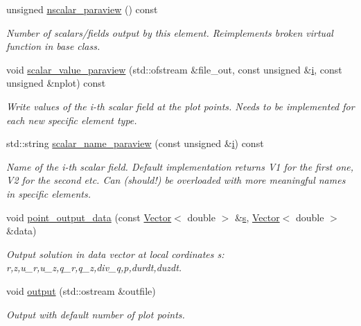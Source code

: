 \begin{DoxyCompactItemize}
unsigned \hyperlink{classoomph_1_1AxisymmetricPoroelasticityEquations_a2c1254018631fe41ba7c480303f3503a}{nscalar\+\_\+paraview} () const
\begin{DoxyCompactList}\small\item\em Number of scalars/fields output by this element. Reimplements broken virtual function in base class. \end{DoxyCompactList}\item 
void \hyperlink{classoomph_1_1AxisymmetricPoroelasticityEquations_a1131ce60ca4c3ad6b213913447e4ac69}{scalar\+\_\+value\+\_\+paraview} (std\+::ofstream \&file\+\_\+out, const unsigned \&\hyperlink{cfortran_8h_adb50e893b86b3e55e751a42eab3cba82}{i}, const unsigned \&nplot) const
\begin{DoxyCompactList}\small\item\em Write values of the i-\/th scalar field at the plot points. Needs to be implemented for each new specific element type. \end{DoxyCompactList}\item 
std\+::string \hyperlink{classoomph_1_1AxisymmetricPoroelasticityEquations_aac4a8c545c8223f5e72249dda357202b}{scalar\+\_\+name\+\_\+paraview} (const unsigned \&\hyperlink{cfortran_8h_adb50e893b86b3e55e751a42eab3cba82}{i}) const
\begin{DoxyCompactList}\small\item\em Name of the i-\/th scalar field. Default implementation returns V1 for the first one, V2 for the second etc. Can (should!) be overloaded with more meaningful names in specific elements. \end{DoxyCompactList}\item 
void \hyperlink{classoomph_1_1AxisymmetricPoroelasticityEquations_a1fce33a1f0ea03b3c339ad0fa531c5c5}{point\+\_\+output\+\_\+data} (const \hyperlink{classoomph_1_1Vector}{Vector}$<$ double $>$ \&\hyperlink{cfortran_8h_ab7123126e4885ef647dd9c6e3807a21c}{s}, \hyperlink{classoomph_1_1Vector}{Vector}$<$ double $>$ \&data)
\begin{DoxyCompactList}\small\item\em Output solution in data vector at local cordinates s\+: r,z,u\+\_\+r,u\+\_\+z,q\+\_\+r,q\+\_\+z,div\+\_\+q,p,durdt,duzdt. \end{DoxyCompactList}\item 
void \hyperlink{classoomph_1_1AxisymmetricPoroelasticityEquations_afb277eef2c340f6fa432eefa415aedf7}{output} (std\+::ostream \&outfile)
\begin{DoxyCompactList}\small\item\em Output with default number of plot points. \end{DoxyCompactList}\item 

\end{DoxyCompactItemize}

